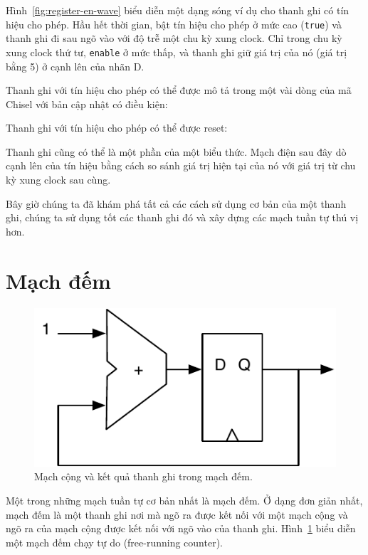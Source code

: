 \documentclass[%
    10pt,
    headinclude, footexclude,
    openright, %
    notitlepage,
    cleardoubleempty,
    headsepline,
    pointlessnumbers,
    bibtotoc, idxtotoc,
    ]{scrbook}
\newcommand{\code}[1]{{\small{\texttt{#1}}}}
\newcommand{\scale}{0.7}
\begin{document}
Hình~\ref{fig:register-en-wave} biểu diễn một dạng sóng ví dụ cho thanh ghi có tín hiệu cho phép. 
Hầu hết thời gian, bật tín hiệu cho phép ở mức cao (\code{true}) và thanh ghi 
đi sau ngõ vào với độ trễ một chu kỳ xung clock. Chỉ trong chu kỳ xung clock thứ tư, \code{enable} ở 
mức thấp, và thanh ghi giữ giá trị của nó (giá trị bằng 5) ở cạnh lên của nhãn D.

Thanh ghi với tín hiệu cho phép có thể được mô tả trong một vài dòng của mã Chisel với bản cập nhật có điều kiện:


\noindent Thanh ghi với tín hiệu cho phép có thể được reset:


Thanh ghi cũng có thể là một phần của một biểu thức. Mạch điện sau đây dò cạnh lên của tín hiệu 
bằng cách so sánh giá trị hiện tại của nó với giá trị từ chu kỳ xung clock sau cùng.


Bây giờ chúng ta đã khám phá tất cả các cách sử dụng cơ bản của một thanh ghi, chúng ta sử dụng tốt các thanh ghi đó 
và xây dựng các mạch tuần tự thú vị hơn.

\section{Mạch đếm}
\label{sec:counter}

\begin{figure}
  \centering
  \includegraphics[scale=\scale]{figures/counter}
  \caption{Mạch cộng và kết quả thanh ghi trong mạch đếm.}
  \label{fig:counter}
\end{figure}

Một trong những mạch tuần tự cơ bản nhất là mạch đếm. Ở dạng đơn giản nhất, mạch đếm là một thanh ghi 
nơi mà ngõ ra được kết nối với một mạch cộng và ngõ ra của mạch cộng được kết nối với ngõ vào của thanh 
ghi. Hình~\ref{fig:counter} biểu diễn một mạch đếm chạy tự do (free-running counter).
\end{document}
